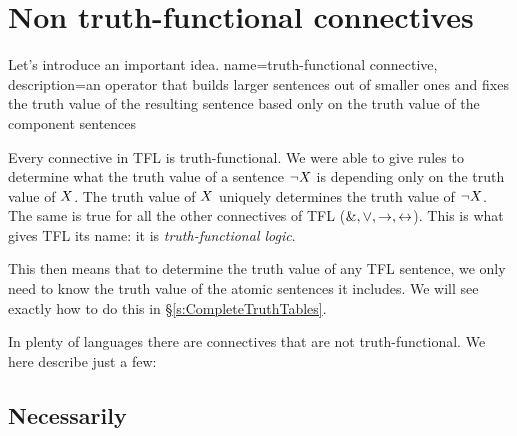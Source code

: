\section{Non truth-functional connectives}

Let's introduce an important idea.
{
name=truth-functional connective,
description={an operator that builds larger sentences out of smaller ones and fixes the \gls{truth value} of the resulting sentence based only on the truth value of the component sentences}
}

Every connective in TFL is truth-functional. We were able to give rules to determine what the truth value of a sentence $\neg X$ is depending only on the truth value of $X$. The truth value of $X$ uniquely determines the truth value of $\neg X$. The same is true for all the other connectives of TFL ($\mathbin{\&},\vee,\rightarrow,\leftrightarrow$). This is what gives TFL its name: it is \emph{truth-functional logic}.


This then means that to determine the truth value of any TFL sentence, we only need to know the truth value of the atomic sentences it includes. We will see exactly how to do this in \S\ref{s:CompleteTruthTables}.




In plenty of languages there are connectives that are not truth-functional. We here describe just a few:

\subsection{Necessarily}


